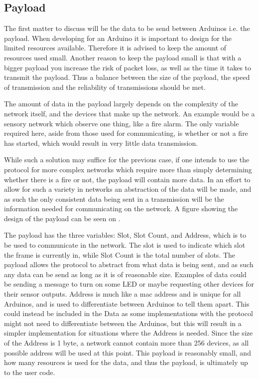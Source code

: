\subsection{Payload}
The first matter to discuss will be the data to be send between Arduinos i.e. the payload.
When developing for an Arduino it is important to design for the limited resources available.
Therefore it is advised to keep the amount of resources used small.
Another reason to keep the payload small is that with a bigger payload you increase the risk of packet loss, as well as the time it takes to transmit the payload.
Thus a balance between the size of the payload, the speed of transmission and the reliability of transmissions should be met.

\bigskip 
The amount of data in the payload largely depends on the complexity of the network itself, and the devices that make up the network.
An example would be a sensory network which observe one thing, like a fire alarm.
The only variable required here, aside from those used for communicating, is whether or not a fire has started, which would result in very little data transmission.

While such a solution may suffice for the previous case, if one intends to use the protocol for more complex networks which require more than simply determining whether there is a fire or not, the payload will contain more data.
In an effort to allow for such a variety in networks an abstraction of the data will be made, and as such the only consistent data being sent in a transmission will be the information needed for communicating on the network.
A figure showing the design of the payload can be seen on .

\bigskip

The payload has the three variables: Slot, Slot Count, and Address, which is to be used to communicate in the network.
The slot is used to indicate which slot the frame is currently in, while Slot Count is the total number of slots.
The payload allows the protocol to abstract from what data is being sent, and as such any data can be send as long as it is of reasonable size. 
Examples of data could be sending a message to turn on some LED or maybe requesting other devices for their sensor outputs.
Address is much like a mac address and is unique for all Arduinos, and is used to differentiate between Arduinos to tell them apart.
This could instead be included in the Data as some implementations with the protocol might not need to differentiate between the Arduinos, but this will result in a simpler implementation for situations where the Address is needed.
Since the size of the Address is 1 byte, a network cannot contain more than 256 devices, as all possible address will be used at this point.
This payload is reasonably small, and how many resources is used for the data, and thus the payload, is ultimately up to the user code.

